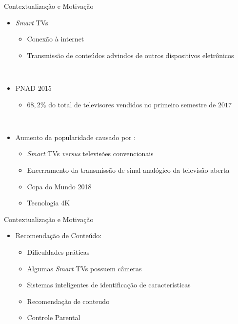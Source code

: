 \begin{frame}{Contextualização e Motivação}

    \begin{itemize}
      \item \alert{\emph{Smart} TVs}
      \begin{itemize}
          \item Conexão à internet
          \item Transmissão de conteúdos advindos de outros dispositivos eletrônicos
      \end{itemize}
      \ \ \newline
      \item PNAD 2015
      \begin{itemize}
        \item $68,2\%$ do total de televisores vendidos no primeiro semestre de $2017$
      \end{itemize}
      \ \ \newline
      \item Aumento da popularidade causado por :
      \begin{itemize}
        \item \emph{Smart} TVs \emph{versus} televisões convencionais
        \item Encerramento da transmissão de sinal analógico da televisão aberta
        \item Copa do Mundo 2018
        \item Tecnologia 4K
      \end{itemize}

    \end{itemize}
\end{frame}

\begin{frame}{Contextualização e Motivação}
   \ \  \\[0.1cm]
  \begin{itemize}
  \item \alert{Recomendação de Conteúdo}:
  \begin{itemize}
    \item Dificuldades práticas
    \item Algumas \emph{Smart} TVs possuem câmeras
    \item Sistemas inteligentes de identificação de características
    \item Recomendação de conteudo
    \item Controle Parental
  \end{itemize}
  \end{itemize}

\end{frame}

